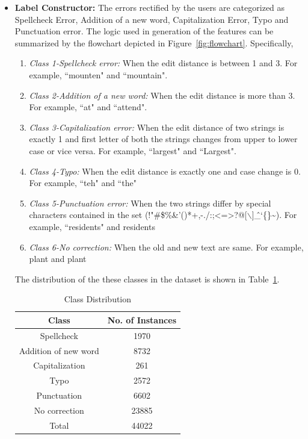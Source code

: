 \documentclass[letterpaper]{article}
\begin{document}
\begin{enumerate}
\begin{itemize}

\item \textbf{Label Constructor: }The errors rectified by the users are categorized as Spellcheck Error, Addition of a new word, Capitalization Error, Typo and Punctuation error. The logic used in generation of the features can be summarized by the flowchart depicted in Figure~\ref{fig:flowchart}. Specifically,
\begin{enumerate}
\item \textit{Class 1-Spellcheck error: }When the edit distance is between 1 and 3. For example, ``mounten" and ``mountain".
\item \textit{Class 2-Addition of a new word: }When the edit distance is more than 3. For example, ``at" and ``attend".
\item \textit{Class 3-Capitalization error: } When the edit distance of two strings is exactly 1 and first letter of both the strings changes from upper to lower case or vice versa. For example, ``largest" and ``Largest".
\item \textit{Class 4-Typo: } When the edit distance is exactly one and case change is 0. For example, ``teh" and ``the"
\item \textit{Class 5-Punctuation error: }When the two strings differ by special characters contained in the set (!"\#\$\%\&'()*+,-./:;\textless=\textgreater?@[$\backslash$]\^\_`\{\textbar\}\textasciitilde). For example, ``residents" and residents
\item \textit{Class 6-No correction: }When the old and new text are same. For example, plant and plant
\end{enumerate}

The distribution of the these classes in the dataset is shown in Table~\ref{table: classes}.

\begin{table}[htdp]
\begin{center}
\begin{tabular}{| c | c |}
\hline
 Class  & No. of Instances \\
\hline
 Spellcheck & 1970 \\
 Addition of new word & 8732 \\
 Capitalization & 261 \\
Typo & 2572 \\
Punctuation & 6602 \\
No correction & 23885 \\
\hline
Total & 44022 \\
\hline
\end{tabular}
\end{center}
\caption{Class Distribution}
\label{table: classes}
\end{table}


\end{itemize}
\end{enumerate}
\end{document}
